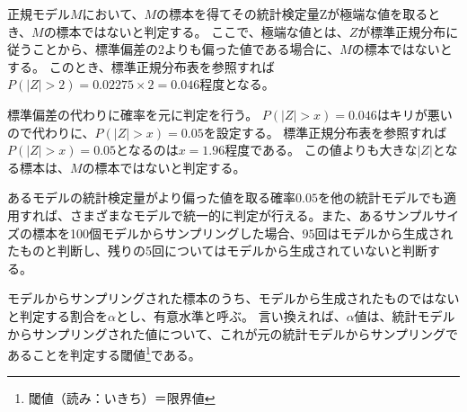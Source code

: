 正規モデル$M$において、$M$の標本を得てその統計検定量Zが極端な値を取るとき、$M$の標本ではないと判定する。
ここで、極端な値とは、$Z$が標準正規分布に従うことから、標準偏差の2よりも偏った値である場合に、$M$の標本ではないとする。
このとき、標準正規分布表を参照すれば$P(|Z|>2)=0.02275\times 2=0.046$程度となる。

標準偏差の代わりに確率を元に判定を行う。
$P(|Z|>x)=0.046$はキリが悪いので代わりに、$P(|Z|>x)=0.05$を設定する。
標準正規分布表を参照すれば$P(|Z|>x)=0.05$となるのは$x=1.96$程度である。
この値よりも大きな$|Z|$となる標本は、$M$の標本ではないと判定する。

あるモデルの統計検定量がより偏った値を取る確率$0.05$を他の統計モデルでも適用すれば、さまざまなモデルで統一的に判定が行える。また、あるサンプルサイズの標本を100個モデルからサンプリングした場合、$95$回はモデルから生成されたものと判断し、残りの5回についてはモデルから生成されていないと判断する。


\begin{defi}
 モデルからサンプリングされた標本のうち、モデルから生成されたものではないと判定する割合を$\alpha$とし、有意水準と呼ぶ。
 言い換えれば、$\alpha$値は、統計モデルからサンプリングされた値について、これが元の統計モデルからサンプリングであることを判定する閾値\footnote{閾値（読み：いきち）＝限界値}である。
\end{defi}







